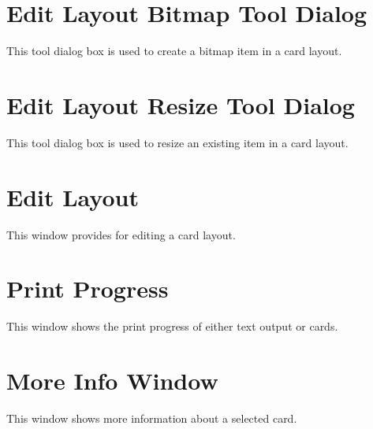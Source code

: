 \section{Edit Layout Bitmap Tool Dialog}
This tool dialog box is used to create a bitmap item in a card layout.
\section{Edit Layout Resize Tool Dialog}
This tool dialog box is used to resize an existing item in a card layout.
\section{Edit Layout}
This window provides for editing a card layout.
\section{Print Progress}
This window shows the print progress of either text output or cards.
\section{More Info Window}
This window shows more information about a selected card.


